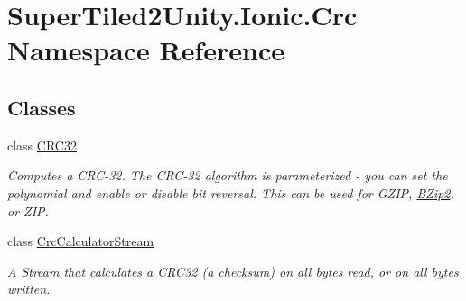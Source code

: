 \hypertarget{namespace_super_tiled2_unity_1_1_ionic_1_1_crc}{}\section{Super\+Tiled2\+Unity.\+Ionic.\+Crc Namespace Reference}
\label{namespace_super_tiled2_unity_1_1_ionic_1_1_crc}
\subsection*{Classes}
\begin{DoxyCompactItemize}
\item 
class \mbox{\hyperlink{class_super_tiled2_unity_1_1_ionic_1_1_crc_1_1_c_r_c32}{C\+R\+C32}}
\begin{DoxyCompactList}\small\item\em Computes a C\+R\+C-\/32. The C\+R\+C-\/32 algorithm is parameterized -\/ you can set the polynomial and enable or disable bit reversal. This can be used for G\+Z\+IP, \mbox{\hyperlink{namespace_super_tiled2_unity_1_1_ionic_1_1_b_zip2}{B\+Zip2}}, or Z\+IP. \end{DoxyCompactList}\item 
class \mbox{\hyperlink{class_super_tiled2_unity_1_1_ionic_1_1_crc_1_1_crc_calculator_stream}{Crc\+Calculator\+Stream}}
\begin{DoxyCompactList}\small\item\em A Stream that calculates a \mbox{\hyperlink{class_super_tiled2_unity_1_1_ionic_1_1_crc_1_1_c_r_c32}{C\+R\+C32}} (a checksum) on all bytes read, or on all bytes written. \end{DoxyCompactList}\end{DoxyCompactItemize}

